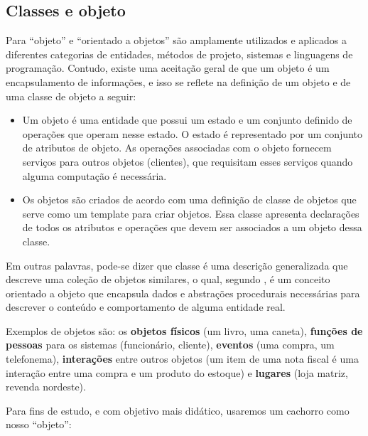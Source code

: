\subsection{Classes e objeto}

Para \cite{sommerville2003engenharia} ``objeto'' e ``orientado a objetos'' são
amplamente utilizados e aplicados a diferentes categorias de entidades, métodos de
projeto, sistemas e linguagens de programação. Contudo, existe uma aceitação
geral de que um objeto é um encapsulamento de informações, e isso se reflete na
definição de um objeto e de uma classe de objeto a seguir:

\begin{itemize}
  \item Um objeto é uma entidade que possui um estado e um conjunto definido de
  operações que operam nesse estado. O estado é representado por um conjunto de
  atributos de objeto. As operações associadas com o objeto fornecem serviços para outros objetos (clientes), que requisitam esses serviços quando alguma computação é necessária.

  \item Os objetos são criados de acordo com uma definição de classe de objetos 
  que serve como um template para criar objetos. Essa classe apresenta 
  declarações de todos os atributos e operações que devem ser associados a um 
  objeto dessa classe.
\end{itemize}

Em outras palavras, pode-se dizer que classe é uma descrição generalizada que
descreve uma coleção de objetos similares, o qual, segundo 
, é um conceito orientado a objeto que 
encapsula dados e abstrações procedurais necessárias para descrever o conteúdo 
e comportamento de alguma entidade real.

Exemplos de objetos são: os \textbf{objetos físicos} (um livro, uma caneta), \textbf{funções de pessoas} para os sistemas (funcionário, cliente), \textbf{eventos} (uma compra, um  telefonema), \textbf{interações} entre outros objetos (um item de uma nota fiscal é uma interação entre uma compra e um produto do estoque) e \textbf{lugares} (loja matriz, revenda nordeste).

Para fins de estudo, e com objetivo mais didático, usaremos um cachorro como 
nosso ``objeto'':


